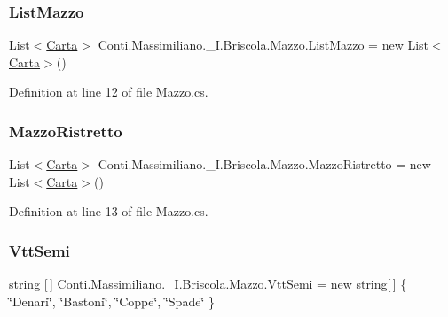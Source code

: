 \subsubsection{\texorpdfstring{List\+Mazzo}{ListMazzo}}
{\footnotesize\ttfamily List$<$\hyperlink{class_conti_1_1_massimiliano_1_1__5_i_1_1_briscola_1_1_carta}{Carta}$>$ Conti.\+Massimiliano.\+\_\+I.\+Briscola.\+Mazzo.\+List\+Mazzo = new List$<$\hyperlink{class_conti_1_1_massimiliano_1_1__5_i_1_1_briscola_1_1_carta}{Carta}$>$()}



Definition at line 12 of file Mazzo.\+cs.

\hypertarget{class_conti_1_1_massimiliano_1_1__5_i_1_1_briscola_1_1_mazzo_a13c61be3aaa21495e679fe83a393b128}{}\label{class_conti_1_1_massimiliano_1_1__5_i_1_1_briscola_1_1_mazzo_a13c61be3aaa21495e679fe83a393b128} 
\subsubsection{\texorpdfstring{Mazzo\+Ristretto}{MazzoRistretto}}
{\footnotesize\ttfamily List$<$\hyperlink{class_conti_1_1_massimiliano_1_1__5_i_1_1_briscola_1_1_carta}{Carta}$>$ Conti.\+Massimiliano.\+\_\+I.\+Briscola.\+Mazzo.\+Mazzo\+Ristretto = new List$<$\hyperlink{class_conti_1_1_massimiliano_1_1__5_i_1_1_briscola_1_1_carta}{Carta}$>$()}



Definition at line 13 of file Mazzo.\+cs.

\hypertarget{class_conti_1_1_massimiliano_1_1__5_i_1_1_briscola_1_1_mazzo_a25dba987afb4a0ce852feb8a32cf3db4}{}\label{class_conti_1_1_massimiliano_1_1__5_i_1_1_briscola_1_1_mazzo_a25dba987afb4a0ce852feb8a32cf3db4} 
\subsubsection{\texorpdfstring{Vtt\+Semi}{VttSemi}}
{\footnotesize\ttfamily string \mbox{[}$\,$\mbox{]} Conti.\+Massimiliano.\+\_\+I.\+Briscola.\+Mazzo.\+Vtt\+Semi = new string\mbox{[}$\,$\mbox{]} \{ \char`\"{}Denari\char`\"{}, \char`\"{}Bastoni\char`\"{}, \char`\"{}Coppe\char`\"{}, \char`\"{}Spade\char`\"{} \}}




